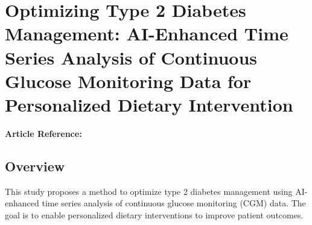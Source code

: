

\section{Optimizing Type 2 Diabetes Management: AI-Enhanced Time Series Analysis of Continuous Glucose Monitoring Data for Personalized Dietary Intervention}
\textbf{Article Reference:} \cite{article_9}

\subsection*{Overview}
This study proposes a method to optimize type 2 diabetes management using AI-enhanced time series analysis of continuous glucose monitoring (CGM) data. The goal is to enable personalized dietary interventions to improve patient outcomes.

